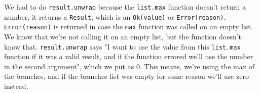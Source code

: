 \begin{blocksection}
\begin{questionmeta}
    We had to do \lstinline{result.unwrap} because the \lstinline{list.max} function doesn't return a number, it returns a \lstinline{Result}, which is an \lstinline{Ok(value)} or \lstinline{Error(reason)}. \lstinline{Error(reason)} is returned in case the \lstinline{max} function was called on an empty list. We know that we're not calling it on an empty list, but the function doesn't know that.
    \lstinline{result.unwrap} says "I want to use the value from this \lstinline{list.max} function if it was a valid result, and if the function errored we'll use the number in the second argument", which we put as 0. This means, we're using the max of the branches, and if the branches list was empty for some reason we'll use zero instead.
\end{questionmeta}
\end{blocksection}
